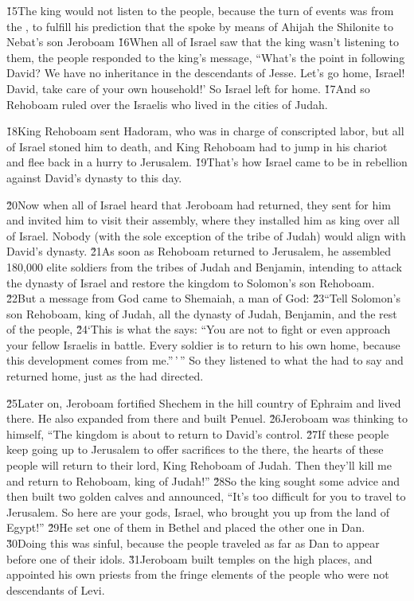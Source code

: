 \v{15}The king would not listen to the people, because the turn of events was from the , to fulfill his prediction that the  spoke by means of Ahijah the Shilonite to Nebat's son Jeroboam \v{16}When all of Israel saw that the king wasn't listening to them, the people responded to the king's message, ``What's the point in following David? We have no inheritance in the descendants of Jesse. Let's go home, Israel! David, take care of your own household!' So Israel left for home. \v{17}And so Rehoboam ruled over the Israelis who lived in the cities of Judah.

\v{18}King Rehoboam sent Hadoram, who was in charge of conscripted labor, but all of Israel stoned him to death, and King Rehoboam had to jump in his chariot and flee back in a hurry to Jerusalem. \v{19}That's how Israel came to be in rebellion against David's dynasty to this day.

\v{20}Now when all of Israel heard that Jeroboam had returned, they sent for him and invited him to visit their assembly, where they installed him as king over all of Israel. Nobody (with the sole exception of the tribe of Judah) would align with David's dynasty. \v{21}As soon as Rehoboam returned to Jerusalem, he assembled 180,000 elite soldiers from the tribes of Judah and Benjamin, intending to attack the dynasty of Israel and restore the kingdom to Solomon's son Rehoboam. \v{22}But a message from God came to Shemaiah, a man of God: \v{23}``Tell Solomon's son Rehoboam, king of Judah, all the dynasty of Judah, Benjamin, and the rest of the people, \v{24}`This is what the  says: ``You are not to fight or even approach your fellow Israelis in battle. Every soldier is to return to his own home, because this development comes from me.''\,'\,'' So they listened to what the  had to say and returned home, just as the  had directed.

\v{25}Later on, Jeroboam fortified Shechem in the hill country of Ephraim and lived there. He also expanded from there and built Penuel. \v{26}Jeroboam was thinking to himself, ``The kingdom is about to return to David's control. \v{27}If these people keep going up to Jerusalem to offer sacrifices to the  there, the hearts of these people will return to their lord, King Rehoboam of Judah. Then they'll kill me and return to Rehoboam, king of Judah!'' \v{28}So the king sought some advice and then built two golden calves and announced, ``It's too difficult for you to travel to Jerusalem. So here are your gods, Israel, who brought you up from the land of Egypt!'' \v{29}He set one of them in Bethel and placed the other one in Dan. \v{30}Doing this was sinful, because the people traveled as far as Dan to appear before one of their idols. \v{31}Jeroboam built temples on the high places, and appointed his own priests from the fringe elements of the people who were not descendants of Levi.

